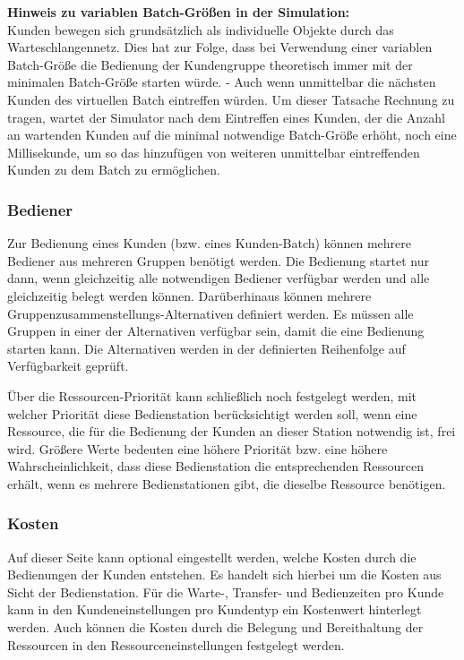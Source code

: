\textbf{Hinweis zu variablen Batch-Größen in der Simulation:}~\\
Kunden bewegen sich grundsätzlich als individuelle Objekte durch das Warteschlangennetz. Dies hat zur Folge, dass bei Verwendung
einer variablen Batch-Größe die Bedienung der Kundengruppe theoretisch immer mit der minimalen Batch-Größe starten würde. - Auch
wenn unmittelbar die nächsten Kunden des virtuellen Batch eintreffen würden. Um dieser Tatsache Rechnung zu tragen, wartet der
Simulator nach dem Eintreffen eines Kunden, der die Anzahl an wartenden Kunden auf die minimal notwendige Batch-Größe erhöht,
noch eine Millisekunde, um so das hinzufügen von weiteren unmittelbar eintreffenden Kunden zu dem Batch zu ermöglichen.

\subsubsection*{Bediener}

Zur Bedienung eines Kunden (bzw. eines Kunden-Batch) können mehrere Bediener aus mehreren Gruppen benötigt werden. Die Bedienung
startet nur dann, wenn gleichzeitig alle notwendigen Bediener verfügbar werden und alle gleichzeitig belegt werden können.
Darüberhinaus können mehrere Gruppenzusammenstellungs-Alternativen definiert werden. Es müssen alle Gruppen in einer der
Alternativen verfügbar sein, damit die eine Bedienung starten kann. Die Alternativen werden in der definierten Reihenfolge
auf Verfügbarkeit geprüft. 

Über die Ressourcen-Priorität kann schließlich noch festgelegt werden, mit welcher Priorität diese Bedienstation
berücksichtigt werden soll, wenn eine Ressource, die für die Bedienung der Kunden an dieser Station notwendig ist,
frei wird. Größere Werte bedeuten eine höhere Priorität bzw. eine höhere Wahrscheinlichkeit, dass diese Bedienstation
die entsprechenden Ressourcen erhält, wenn es mehrere Bedienstationen gibt, die dieselbe Ressource benötigen.

\subsubsection*{Kosten}

Auf dieser Seite kann optional eingestellt werden, welche Kosten durch die Bedienungen der Kunden entstehen.
Es handelt sich hierbei um die Kosten aus Sicht der Bedienstation. Für die Warte-, Transfer- und Bedienzeiten pro
Kunde kann in den Kundeneinstellungen pro Kundentyp ein Kostenwert hinterlegt werden. Auch können die Kosten durch
die Belegung und Bereithaltung der Ressourcen in den Ressourceneinstellungen festgelegt werden.


